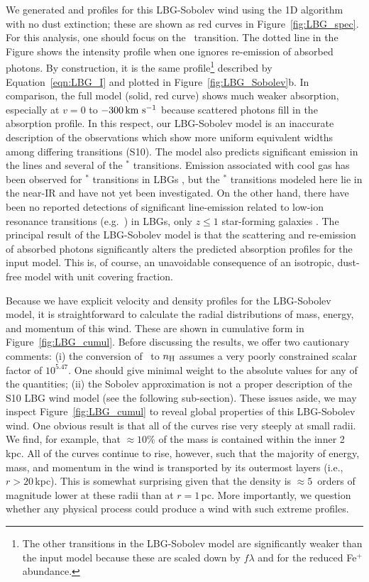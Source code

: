 \documentclass[12pt,preprint]{aastex}
\begin{document}
We generated  and  profiles for this LBG-Sobolev
wind
using the 1D algorithm with no dust extinction; these are shown as
red curves in Figure~\ref{fig:LBG_spec}.   For this analysis, one
should focus on the \mgiia\ transition.  The dotted line in the Figure
shows the intensity profile when one ignores re-emission
of absorbed photons.  By construction, it is the same profile\footnote{
  The other transitions in
  the LBG-Sobolev model are significantly weaker than the input model
  because these are scaled down by $f\lambda$ and 
  for  the reduced Fe$^+$ abundance.} 
described by Equation~\ref{eqn:LBG_I} and plotted in
Figure~\ref{fig:LBG_Sobolev}b.   In comparison, the full model (solid,
red curve)
shows much weaker absorption, especially at $v = 0$ to $-300 \, {\rm km~s^{-1}}$
because scattered photons fill in the absorption profile.
In this respect, our LBG-Sobolev model is an
inaccurate description of the observations which show more uniform
equivalent widths among differing transitions (S10). The model
also predicts significant emission in the  lines and several of
the $^*$ transitions.   Emission associated with cool gas
has been observed for $^*$
transitions in LBGs \citep{prs+02,shapley03}, but
the $^*$ transitions
modeled here lie in the near-IR and have not yet been investigated.
On the other hand, there have been no 
reported detections of significant line-emission related to low-ion resonance
transitions (e.g.\ ) in LBGs, only $z \le 1$ star-forming galaxies
\citep{wcp+09,rwk+10}.  
The principal result of the LBG-Sobolev model is that the scattering and re-emission of
absorbed photons significantly alters the predicted absorption profiles
for the input %
model.  This is, of course, an unavoidable
consequence of an isotropic, dust-free model with unit covering
fraction.

Because we have explicit velocity and density profiles for the LBG-Sobolev
model, it is straightforward to calculate the radial
distributions of mass, energy, and momentum of
this wind.  These are shown in cumulative form in
Figure~\ref{fig:LBG_cumul}.  Before discussing the results, we offer
two cautionary comments: (i) the conversion of \nmg\ to $n_{\rm H}$
assumes a very poorly constrained scalar factor of $10^{5.47}$.  One
should give minimal weight to the absolute values for any of the
quantities;
(ii) the Sobolev approximation is not a proper description of the S10
LBG wind model (see the following sub-section).
These issues aside, we may inspect Figure~\ref{fig:LBG_cumul} to reveal
global properties of this LBG-Sobolev wind.
One obvious result is that all of the curves rise very steeply at
small radii.  We find, for example, that $\approx 10\%$ of the mass is
contained within the inner 2\,kpc.  All of the curves continue to
rise, however, such that the majority of energy, mass, and momentum in
the wind is transported by its outermost layers (i.e., $r > 20$\,kpc).
This is somewhat surprising given that the density is $\approx
5$~orders of magnitude lower at these radii than at $r = 1$\,pc.
More importantly, we question whether any physical process could
produce a wind with such extreme profiles. 
\end{document}
